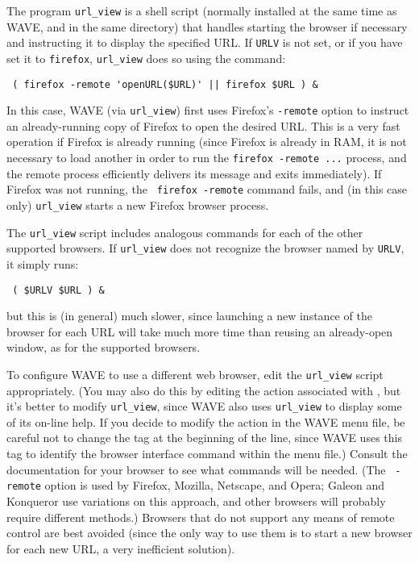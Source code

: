 \documentclass[twoside]{book}
\newcommand{\WAVE}{{\sf WAVE}\xspace}
\begin{document}
The program {\tt url\_view} is a shell script (normally installed at the
same time as \WAVE{}, and in the same directory) that handles starting
the browser if necessary and instructing it to display the specified
URL.  If {\tt URLV} is not set, or if you have set it to {\tt firefox},
{\tt url\_view} does so using the command:
\begin{verbatim}
 ( firefox -remote 'openURL($URL)' || firefox $URL ) &
\end{verbatim}
\noindent
In this case, \WAVE{} (via {\tt url\_view}) first uses Firefox's
{\tt -remote} option to instruct an already-running copy of Firefox
to open the desired URL.  This is a very fast operation if Firefox is
already running (since Firefox is already in RAM, it is not necessary
to load another in order to run the {\tt firefox -remote ...}
process, and the remote process efficiently delivers its message and
exits immediately).  If Firefox was not running, the {\tt
firefox -remote} command fails, and (in this case only) {\tt url\_view}
starts a new Firefox browser process.

The {\tt url\_view} script includes analogous commands for each of the other
supported browsers.  If {\tt url\_view} does not recognize the browser named by
{\tt URLV}, it simply runs:
\begin{verbatim}
 ( $URLV $URL ) &
\end{verbatim}
\noindent
but this is (in general) much slower, since launching a new instance of the
browser for each URL will take much more time than reusing an already-open
window, as for the supported browsers.

To configure \WAVE{} to use a different web browser, edit the {\tt url\_view}
script appropriately.  (You may also do this by editing the action associated
with {\tt <Open URL>}, but it's better to modify {\tt url\_view}, since \WAVE{}
also uses {\tt url\_view} to display some of its on-line help.  If you decide
to modify the action in the \WAVE{} menu file, be careful not to change the
{\tt <Open URL>} tag at the beginning of the line, since \WAVE{} uses this tag
to identify the browser interface command within the menu file.)  Consult the
documentation for your browser to see what commands will be needed.  (The {\tt
-remote} option is used by Firefox, Mozilla, Netscape, and Opera;  Galeon and
Konqueror use variations on this approach, and other browsers will
probably require different methods.)  Browsers that do not support any means of
remote control are best avoided (since the only way to use them is to start a
new browser for each new URL, a very inefficient solution).
\end{document}
